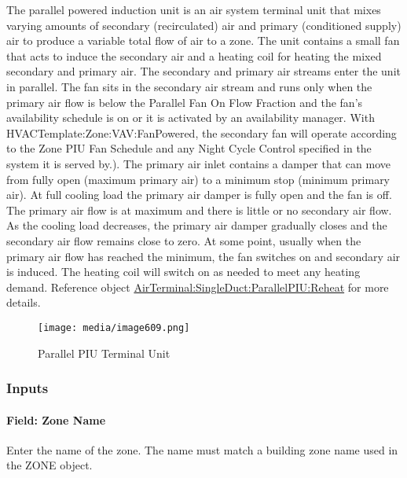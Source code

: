 The parallel powered induction unit is an air system terminal unit that mixes varying amounts of secondary (recirculated) air and primary (conditioned supply) air to produce a variable total flow of air to a zone. The unit contains a small fan that acts to induce the secondary air and a heating coil for heating the mixed secondary and primary air. The secondary and primary air streams enter the unit in parallel. The fan sits in the secondary air stream and runs only when the primary air flow is below the Parallel Fan On Flow Fraction and the fan's availability schedule is on or it is activated by an availability manager. With HVACTemplate:Zone:VAV:FanPowered, the secondary fan will operate according to the Zone PIU Fan Schedule and any Night Cycle Control specified in the system it is served by.). The primary air inlet contains a damper that can move from fully open (maximum primary air) to a minimum stop (minimum primary air). At full cooling load the primary air damper is fully open and the fan is off. The primary air flow is at maximum and there is little or no secondary air flow. As the cooling load decreases, the primary air damper gradually closes and the secondary air flow remains close to zero. At some point, usually when the primary air flow has reached the minimum, the fan switches on and secondary air is induced. The heating coil will switch on as needed to meet any heating demand. Reference object \hyperref[airterminalsingleductparallelpiureheat]{AirTerminal:SingleDuct:ParallelPIU:Reheat} for more details.

\begin{figure}[hbtp] %
\centering
\texttt{[image: media/image609.png]}
\caption{Parallel PIU Terminal Unit \protect \label{fig:parallel-piu-terminal-unit-001}}
\end{figure}

\subsubsection{Inputs}\label{inputs-2016-06-16-1620}

\paragraph{Field: Zone Name}\label{field-zone-name-2016-06-16-1620}

Enter the name of the zone. The name must match a building zone name used in the ZONE object.

